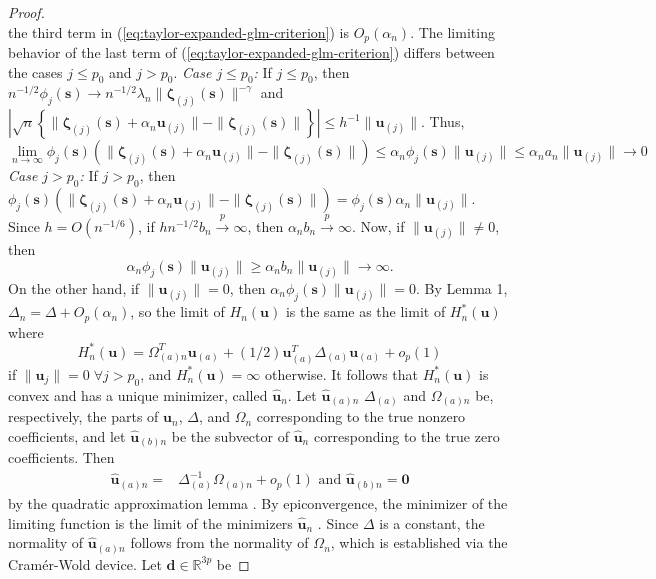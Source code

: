 \documentclass[authoryear,review, 12pt]{elsarticle}
\begin{document}
\begin{proof}
\[\]
the third term in (\ref{eq:taylor-expanded-glm-criterion}) is $O_{p}\left(\alpha_{n}\right)$.
The limiting behavior of the last term of (\ref{eq:taylor-expanded-glm-criterion})
differs between the cases $j\le p_{0}$ and $j>p_{0}$.
\emph{Case $j\le p_{0}$:} If $j\le p_{0}$, then $n^{-1/2}\phi_{j}(\bm{s})\to n^{-1/2}\lambda_{n}\|\bm{\zeta}_{(j)}(\bm{s})\|^{-\gamma}$
and $|\sqrt{n}\left\{ \|\bm{\zeta}_{(j)}(\bm{s})+\alpha_{n}\bm{u}_{(j)}\|-\|\bm{\zeta}_{(j)}(\bm{s})\|\right\} |\le h^{-1}\|\bm{u}_{(j)}\|$. Thus, 
\[
\lim\limits _{n\to\infty}\phi_{j}(\bm{s})\left(\|\bm{\zeta}_{(j)}(\bm{s})+\alpha_{n}\bm{u}_{(j)}\|-\|\bm{\zeta}_{(j)}(\bm{s})\|\right)\le\alpha_{n}\phi_{j}(\bm{s})\|\bm{u}_{(j)}\|\le\alpha_{n}a_{n}\|\bm{u}_{(j)}\|\to0
\]
\emph{Case $j>p_{0}$:} If $j>p_{0}$, then $\phi_{j}(\bm{s})\left(\|\bm{\zeta}_{(j)}(\bm{s})+\alpha_{n}\bm{u}_{(j)}\|-\|\bm{\zeta}_{(j)}(\bm{s})\|\right)=\phi_{j}(\bm{s})\alpha_{n}\|\bm{u}_{(j)}\|$.
Since $h=O(n^{-1/6})$, if $hn^{-1/2}b_{n}\xrightarrow{p}\infty$,
then $\alpha_{n}b_{n}\xrightarrow{p}\infty$. Now, if $\|\bm{u}_{(j)}\|\ne0$,
then 
\[
\alpha_{n}\phi_{j}(\bm{s})\|\bm{u}_{(j)}\|\ge\alpha_{n}b_{n}\|\bm{u}_{(j)}\|\to\infty.
\]
On the other hand, if $\|\bm{u}_{(j)}\|=0$, then $\alpha_{n}\phi_{j}(\bm{s})\|\bm{u}_{(j)}\|=0$.
By Lemma 1, $\Delta_{n}=\Delta+O_{p}\left(\alpha_{n}\right)$,
so the limit of $H_{n}(\bm{u})$ is the same as the limit of $H_{n}^{*}(\bm{u})$
where
\[
H_{n}^{*}(\bm{u})=\Omega_{(a)n}^{T}\bm{u}_{(a)}+(1/2)\bm{u}_{(a)}^{T}\Delta_{(a)}\bm{u}_{(a)}+o_{p}\left(1\right)
\]
if $\|\bm{u}_{j}\|=0\;\forall j>p_{0}$, and $H_{n}^{*}(\bm{u})=\infty$
otherwise. It follows that $H_{n}^{*}(\bm{u})$ is convex and has
a unique minimizer, called $\hat{\bm{u}}_{n}$. Let $\hat{\bm{u}}_{(a)n}$
$\Delta_{(a)}$ and $\Omega_{(a)n}$ be, respectively, the parts of
$\bm{u}_{n}$, $\Delta$, and $\Omega_{n}$ corresponding to the true
nonzero coefficients, and let $\hat{\bm{u}}_{(b)n}$ be the subvector
of $\hat{\bm{u}}_{n}$ corresponding to the true zero coefficients.
Then
\begin{align*}
\hat{\bm{u}}_{(a)n}= & \Delta_{(a)}^{-1}\Omega_{(a)n}+o_{p}\left(1\right)\text{ and }\hat{\bm{u}}_{(b)n}=\bm{0}
\end{align*}
by the quadratic approximation lemma \citep{Fan-Gijbels-1996}. By epiconvergence, the minimizer of the limiting function is the limit
of the minimizers $\hat{\bm{u}}_{n}$ \citep{Geyer-1994,Knight-Fu-2000}.
Since $\Delta$ is a constant, the normality of $\hat{\bm{u}}_{(a)n}$
follows from the normality of $\Omega_{n}$, which is established
via the Cram\'{e}r-Wold device. Let $\bm{d}\in\mathbb{R}^{3p}$ be

\end{proof}
\end{document}
